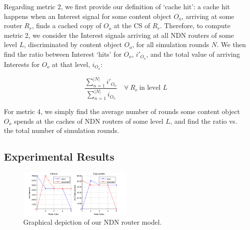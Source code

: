 Regarding metric 2, we first provide our definition of `cache hit': a cache hit 
happens when an Interest signal for some content object $O_o$, arriving at some 
router $R_r$, finds a cached copy of $O_o$ at the CS of $R_r$. Therefore, to 
compute metric 2, we consider the Interest signals 
arriving at all NDN routers of some level $L$, discriminated by content 
object $O_o$, for all simulation rounds $N$. We then find the ratio between Interest 
`hits' for $O_o$, $i'_{O_o}$, and the total value of arriving Interests for $O_o$ at that 
level, $i_{O_o}$:

\begin{equation}
    \frac{\sum_{n=1}^{|N|} i'_{O_o}}{\sum_{n=1}^{|N|} i_{O_o}} \quad \forall \ R_r \ \text{in level $L$}
    \label{eq:exp-setup-metrics-2}
\end{equation}\shortvertbreak

For metric 4, we simply find the average number of rounds 
some content object $O_o$ spends at the caches of NDN routers of some level $L$, and find 
the ratio vs. the total number of simulation rounds.

\subsection{Experimental Results}
\label{subsec:exp-results}

\begin{figure}[h!]

    \centering
    \includegraphics[width=0.50\textwidth]{figures/pre-test.png}
    \cprotect\caption{Graphical depiction of our NDN router model.}
    \label{fig:pre-test}

\end{figure}


